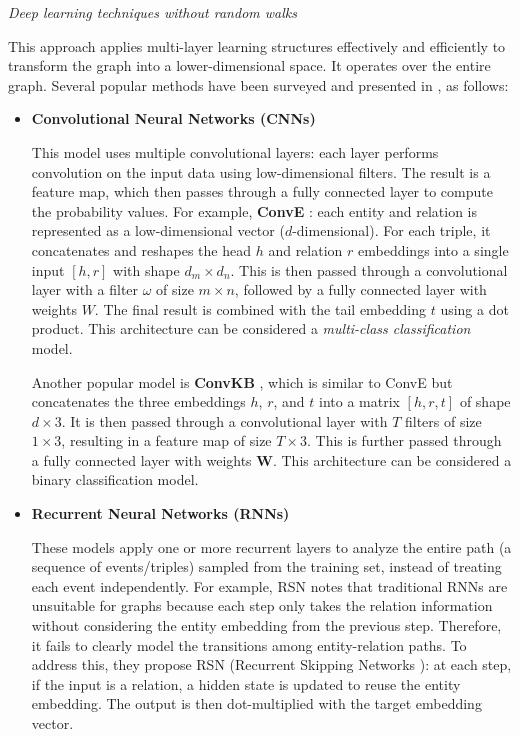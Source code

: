 \textit{Deep learning techniques without random walks}

This approach applies multi-layer learning structures effectively and efficiently to transform the graph into a lower-dimensional space. It operates over the entire graph. Several popular methods have been surveyed and presented in \cite{rossi2020knowledge}, as follows:

\begin{itemize}
	\item \textbf{Convolutional Neural Networks (CNNs)}
	
	This model uses multiple convolutional layers: each layer performs convolution on the input data using low-dimensional filters. The result is a feature map, which then passes through a fully connected layer to compute the probability values. For example, \textbf{ConvE} \cite{dettmers2017convolutional}: each entity and relation is represented as a low-dimensional vector ($d$-dimensional). For each triple, it concatenates and reshapes the head $h$ and relation $r$ embeddings into a single input $[h, r]$ with shape $d_m \times d_n$. This is then passed through a convolutional layer with a filter $\omega$ of size $m \times n$, followed by a fully connected layer with weights $W$. The final result is combined with the tail embedding $t$ using a dot product. This architecture can be considered a \textit{multi-class classification} model.
	
	Another popular model is \textbf{ConvKB} \cite{nguyen2017novel}, which is similar to ConvE but concatenates the three embeddings $h$, $r$, and $t$ into a matrix $[h, r, t]$ of shape $d \times 3$. It is then passed through a convolutional layer with $T$ filters of size $1 \times 3$, resulting in a feature map of size $T \times 3$. This is further passed through a fully connected layer with weights $\mathbf{W}$. This architecture can be considered a binary classification model.
	
	\item \textbf{Recurrent Neural Networks (RNNs)}
	
	These models apply one or more recurrent layers to analyze the entire path (a sequence of events/triples) sampled from the training set, instead of treating each event independently. For example, RSN \cite{guo2019learning} notes that traditional RNNs are unsuitable for graphs because each step only takes the relation information without considering the entity embedding from the previous step. Therefore, it fails to clearly model the transitions among entity-relation paths. To address this, they propose RSN (Recurrent Skipping Networks \cite{guo2019learning}): at each step, if the input is a relation, a hidden state is updated to reuse the entity embedding. The output is then dot-multiplied with the target embedding vector.
	

\end{itemize}
